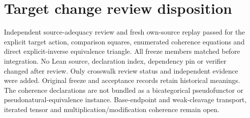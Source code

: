 \documentclass{article}
\begin{document}
\section*{Target change review disposition}
Independent source-adequacy review and fresh own-source replay passed for the explicit target action, comparison squares, enumerated coherence equations and direct explicit-inverse equivalence triangle. All freeze members matched before integration. No Lean source, declaration index, dependency pin or verifier changed after review. Only crosswalk review status and independent evidence were added. Original freeze and acceptance records retain historical meanings.
The coherence declarations are not bundled as a bicategorical pseudofunctor or pseudonatural-equivalence instance. Base-endpoint and weak-cleavage transport, iterated tensor and multiplication/modification coherence remain open.
\end{document}
